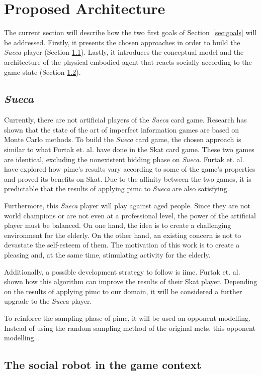 \section{Proposed Architecture} \label{architecture}

The current section will describe how the two first goals of
Section~\ref{sec:goals} will be addressed.
Firstly, it presents the chosen approaches in order to build the \emph{Sueca} player (Section \ref{sec:sueca_solution}).
Lastly, it introduces the conceptual model and the architecture of the physical embodied agent that reacts socially according to the game state (Section \ref{sec:social_solution}).


\subsection{\emph{Sueca}}
\label{sec:sueca_solution}

Currently, there are not artificial players of the \emph{Sueca} card game.
Research has shown that the state of the art of imperfect information games are based on Monte Carlo methods.
To build the \emph{Sueca} card game, the chosen approach is similar to what Furtak et. al. have done in the Skat card game.
These two games are identical, excluding the nonexistent bidding phase on \emph{Sueca}.
Furtak et. al. have explored how \gls{pimc}'s results vary according to some of the game's properties and proved its benefits on Skat.
Due to the affinity between the two games, it is predictable that the results of applying \gls{pimc} to \emph{Sueca} are also satisfying.

Furthermore, this \emph{Sueca} player will play against aged people.
Since they are not world champions or are not even at a professional level, the power of the artificial player must be balanced.
On one hand, the idea is to create a challenging environment for the elderly.
On the other hand, an existing concern is not to devastate the self-esteem of them.
The motivation of this work is to create a pleasing and, at the same time, stimulating activity for the elderly.

Additionally, a possible development strategy to follow is \gls{iimc}.
Furtak et. al. shown how this algorithm can improve the results of their Skat player.
Depending on the results of applying \gls{pimc} to our domain, it will be considered a further upgrade to the \emph{Sueca} player.

To reinforce the sampling phase of \gls{pimc}, it will be used an opponent modelling.
Instead of using the random sampling method of the original \gls{mcts}, this opponent modelling...


\subsection{The social robot in the game context}
\label{sec:social_solution}

